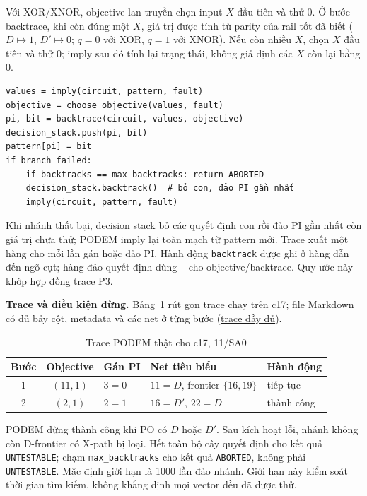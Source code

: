 Với XOR/XNOR, objective lan truyền chọn input $X$ đầu tiên và thử 0.
Ở bước backtrace, khi còn đúng một $X$, giá trị được tính từ parity của
rail tốt đã biết ($D\mapsto1$, $D'\mapsto0$; $q=0$ với XOR, $q=1$ với
XNOR). Nếu còn nhiều $X$, chọn $X$ đầu tiên và thử 0; imply sau đó tính
lại trạng thái, không giả định các $X$ còn lại bằng 0.

\begin{verbatim}
values = imply(circuit, pattern, fault)
objective = choose_objective(values, fault)
pi, bit = backtrace(circuit, values, objective)
decision_stack.push(pi, bit)
pattern[pi] = bit
if branch_failed:
    if backtracks == max_backtracks: return ABORTED
    decision_stack.backtrack()  # bỏ con, đảo PI gần nhất
    imply(circuit, pattern, fault)
\end{verbatim}

Khi nhánh thất bại, decision stack bỏ các quyết định con rồi đảo PI gần
nhất còn giá trị chưa thử; PODEM imply lại toàn mạch từ pattern mới.
Trace xuất một hàng cho mỗi lần gán hoặc đảo PI. Hành động \texttt{backtrack}
được ghi ở hàng dẫn đến ngõ cụt; hàng đảo quyết định dùng \texttt{—} cho
objective/backtrace. Quy ước này khớp hợp đồng trace P3.

\textbf{Trace và điều kiện dừng.}
Bảng~\ref{tab:p5-trace} rút gọn trace chạy trên c17; file Markdown có đủ
bảy cột, metadata và các net ở từng bước
(\href{../results/trace_c17_11sa0.md}{trace đầy đủ}).

\begin{table}[H]
\centering\small
\caption{Trace PODEM thật cho c17, 11/SA0}
\label{tab:p5-trace}
\begin{tabular}{cclll}
\hline
Bước & Objective & Gán PI & Net tiêu biểu & Hành động\\
\hline
1 & $(11,1)$ & $3=0$ & $11=D$, frontier $\{16,19\}$ & tiếp tục\\
2 & $(2,1)$ & $2=1$ & $16=D'$, $22=D$ & thành công\\
\hline
\end{tabular}
\end{table}

PODEM dừng thành công khi PO có $D$ hoặc $D'$. Sau kích hoạt lỗi, nhánh
không còn D-frontier có X-path bị loại. Hết toàn bộ cây quyết định cho kết
quả \texttt{UNTESTABLE}; chạm \texttt{max\_backtracks} cho kết quả
\texttt{ABORTED}, không phải \texttt{UNTESTABLE}. Mặc định giới hạn là
1000 lần đảo nhánh. Giới hạn này kiểm soát thời gian tìm kiếm, không khẳng
định mọi vector đều đã được thử.

